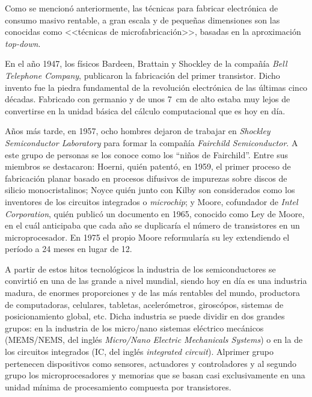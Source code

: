 		Como se mencionó anteriormente, las técnicas para fabricar electrónica de consumo masivo rentable, a gran escala y de pequeñas dimensiones son las conocidas como <<técnicas de microfabricación>>, basadas en la aproximación \textit{top-down}. \cite{Jaeger2001}

		En el año 1947, los físicos Bardeen, Brattain y Shockley de la compañía \textit{Bell Telephone Company}, publicaron la fabricación del primer transistor. Dicho invento fue la piedra fundamental de la revolución electrónica de las últimas cinco décadas. Fabricado con germanio y de unos \SI{7}{cm} de alto estaba muy lejos de convertirse en la unidad básica del cálculo computacional que es hoy en día. \cite{riordan1999} 

		Años más tarde, en 1957, ocho hombres dejaron de trabajar en \textit{Shockley Semiconductor Laboratory} para formar la compañía \textit{Fairchild Semiconductor}. A este grupo de personas se los conoce como los ``niños de Fairchild''. Entre sus miembros se destacaron: Hoerni, quién patentó, en 1959, el primer proceso de fabricación planar basado en   procesos difusivos de impurezas sobre discos de silicio monocristalinos; Noyce quién junto con Kilby son considerados como los inventores de los circuitos integrados o \textit{microchip}; y Moore, cofundador de \textit{Intel Corporation}, quién publicó un documento en 1965, conocido como Ley de Moore, en el cuál anticipaba que cada año se duplicaría el número de transistores en un microprocesador. En 1975 el propio Moore reformularía su ley extendiendo el período a 24 meses en lugar de 12. \cite{moore2006,riordan1999,fagen1984}

		A partir de estos hitos tecnológicos la industria de los semiconductores se convirtió en una de las grande a nivel mundial, siendo hoy en día es una industria madura, de enormes proporciones y de las más rentables del mundo, productora de computadoras, celulares, tabletas, acelerómetros, giroscópos, sistemas de posicionamiento global, etc. Dicha industria se puede dividir en dos grandes grupos: en la industria de los micro/nano sistemas eléctrico mecánicos (MEMS/NEMS, del inglés \textit{Micro/Nano Electric Mechanicals Systems}) o en la de los circuitos integrados (IC, del inglés \textit{integrated circuit}). Al\space primer grupo pertenecen dispositivos como sensores, actuadores y controladores y al segundo grupo los microprocesadores y memorias que se basan casi exclusivamente en una unidad mínima de procesamiento compuesta por transistores.\cite{Franssila2004,Jaeger2001,Madou2002}

